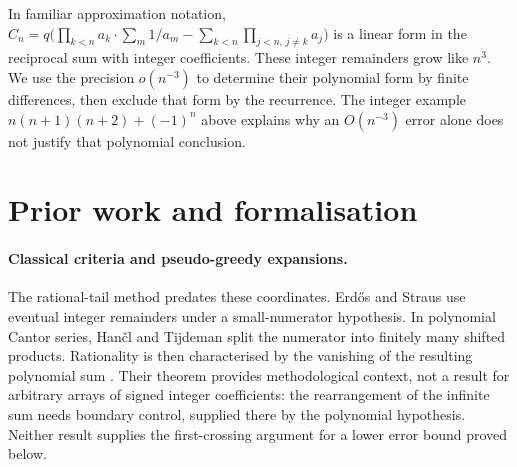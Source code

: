 \documentclass[11pt]{article}
\begin{document}
In familiar approximation notation,
$C_n=q\bigl(\prod_{k<n}a_k\cdot\sum_m1/a_m-\sum_{k<n}\prod_{j<n,\,j\ne k}a_j\bigr)$
is a linear form in the reciprocal sum with integer coefficients.
These integer remainders grow like $n^3$. We use the precision
$o(n^{-3})$ to determine their polynomial form by finite differences,
then exclude that form by the recurrence. The integer example
$n(n+1)(n+2)+(-1)^n$ above explains why an $O(n^{-3})$ error alone
does not justify that polynomial conclusion.

\section{Prior work and formalisation}\label{long243:sec:priorwork}

\paragraph{Classical criteria and pseudo-greedy expansions.}
The rational-tail method predates these coordinates. Erd\H{o}s and Straus
\cite[Theorem~2.1, pp.~85--86]{erdosstraus1974} use eventual integer
remainders under a small-numerator hypothesis. In polynomial Cantor
series, Han\v{c}l and Tijdeman split the numerator into finitely many
shifted products. Rationality is then characterised by the vanishing of
the resulting polynomial sum
\cite[Theorem~2.2 and its proof, pp.~39--40]{hancltijdeman2008}.
Their theorem provides methodological context, not a result for arbitrary
arrays of signed integer coefficients: the rearrangement of the infinite
sum needs boundary control, supplied there by the polynomial hypothesis.
Neither result supplies the first-crossing argument for a lower error
bound proved below.
\end{document}
